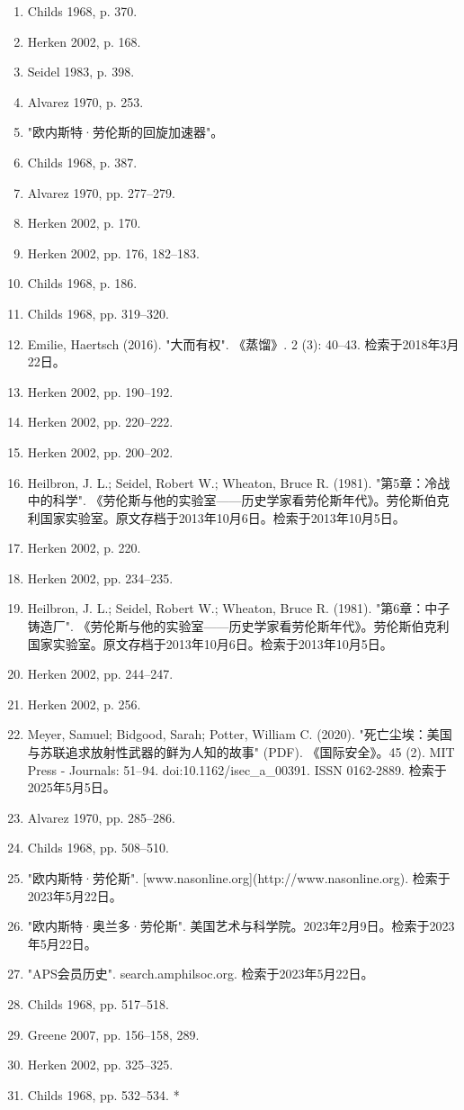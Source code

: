 \begin{enumerate}
\item Childs 1968, p. 370.
\item Herken 2002, p. 168.
\item Seidel 1983, p. 398.
\item Alvarez 1970, p. 253.
\item "欧内斯特·劳伦斯的回旋加速器"。
\item Childs 1968, p. 387.
\item Alvarez 1970, pp. 277–279.
\item Herken 2002, p. 170.
\item Herken 2002, pp. 176, 182–183.
\item Childs 1968, p. 186.
\item Childs 1968, pp. 319–320.
\item Emilie, Haertsch (2016). "大而有权". 《蒸馏》. 2 (3): 40–43. 检索于2018年3月22日。
\item Herken 2002, pp. 190–192.
\item Herken 2002, pp. 220–222.
\item Herken 2002, pp. 200–202.
\item Heilbron, J. L.; Seidel, Robert W.; Wheaton, Bruce R. (1981). "第5章：冷战中的科学". 《劳伦斯与他的实验室——历史学家看劳伦斯年代》。劳伦斯伯克利国家实验室。原文存档于2013年10月6日。检索于2013年10月5日。
\item Herken 2002, p. 220.
\item Herken 2002, pp. 234–235.
\item Heilbron, J. L.; Seidel, Robert W.; Wheaton, Bruce R. (1981). "第6章：中子铸造厂". 《劳伦斯与他的实验室——历史学家看劳伦斯年代》。劳伦斯伯克利国家实验室。原文存档于2013年10月6日。检索于2013年10月5日。
\item Herken 2002, pp. 244–247.
\item Herken 2002, p. 256.
\item Meyer, Samuel; Bidgood, Sarah; Potter, William C. (2020). "死亡尘埃：美国与苏联追求放射性武器的鲜为人知的故事" (PDF). 《国际安全》。45 (2). MIT Press - Journals: 51–94. doi:10.1162/isec\_a\_00391. ISSN 0162-2889. 检索于2025年5月5日。
\item Alvarez 1970, pp. 285–286.
\item Childs 1968, pp. 508–510.
\item "欧内斯特·劳伦斯". [www.nasonline.org](http://www.nasonline.org). 检索于2023年5月22日。
\item "欧内斯特·奥兰多·劳伦斯". 美国艺术与科学院。2023年2月9日。检索于2023年5月22日。
\item "APS会员历史". search.amphilsoc.org. 检索于2023年5月22日。
\item Childs 1968, pp. 517–518.
\item Greene 2007, pp. 156–158, 289.
\item Herken 2002, pp. 325–325.
\item Childs 1968, pp. 532–534.
*


\end{enumerate}
